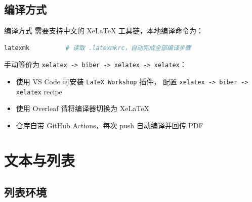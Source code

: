 \documentclass[aspectratio=169]{beamer}
\begin{document}
\subsection{编译方式}

\begin{frame}[fragile]{编译方式}
    需要支持中文的 Xe\LaTeX{} 工具链，本地编译命令为：
    \begin{lstlisting}[language=bash,numbers=none]
latexmk          # 读取 .latexmkrc，自动完成全部编译步骤
\end{lstlisting}
    手动等价为 \texttt{xelatex -> biber -> xelatex -> xelatex}：
    \begin{itemize}
        \item 使用 VS Code 可安装 \texttt{LaTeX Workshop} 插件，
              配置 \texttt{xelatex -> biber -> xelatex} recipe
        \item 使用 Overleaf 请将编译器切换为 XeLaTeX
        \item 仓库自带 GitHub Actions，每次 push 自动编译并回传 PDF
    \end{itemize}
\end{frame}

\section{文本与列表}

\subsection{列表环境}
\end{document}
